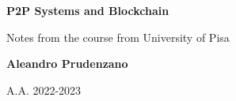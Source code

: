\begin{titlepage}
    \begin{center}
        \vspace*{1cm}

        \huge
        \textbf{P2P Systems and Blockchain}

        \vspace{0.5cm}

        Notes from the course from University of Pisa

        \vspace{1.5cm}

        \textbf{Aleandro Prudenzano}

        \vfill
        \vspace{0.8cm}

        A.A. 2022-2023

    \end{center}
\end{titlepage}

\clearpage
\begingroup
  \pagestyle{empty}
  \null
  \newpage
\endgroup

\renewcommand{\contentsname}{Index}
\tableofcontents

\clearpage
\begingroup
  \pagestyle{empty}
  \null
  \newpage
\endgroup
